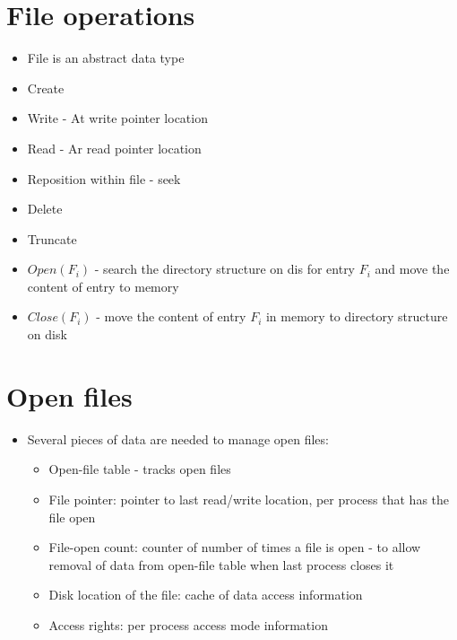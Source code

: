 \documentclass{article}[18pt]
\begin{document}
\section{File operations}
\begin{itemize}
	\item File is an abstract data type
	\item Create
	\item Write - At write pointer location
	\item Read - Ar read pointer location
	\item Reposition within file - seek
	\item Delete
	\item Truncate
	\item $Open(F_i)$ - search the directory structure on dis for entry $F_i$ and move the content of entry to memory
	\item $Close(F_i)$ - move the content of entry $F_i$ in memory to directory structure on disk
\end{itemize}
\section{Open files}
\begin{itemize}
	\item Several pieces of data are needed to manage open files:
	\begin{itemize}
		\item Open-file table - tracks open files
		\item File pointer: pointer to last read/write location, per process that has the file open
		\item File-open count: counter of number of times a file is open  - to allow removal of data from open-file table when last process closes it
		\item Disk location of the file: cache of data access information
		\item Access rights: per process access mode information
	\end{itemize}
\end{itemize}
\end{document}
